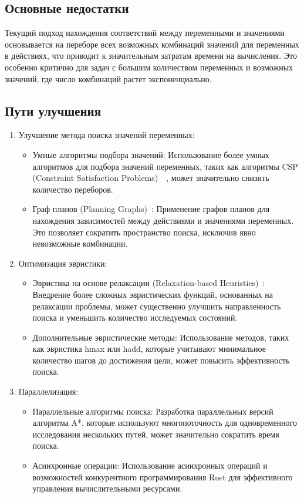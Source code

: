 \documentclass{article}
\begin{document}
\subsection{Основные недостатки}

Текущий подход нахождения соответствий между переменными и значениями основывается на переборе всех возможных комбинаций значений для переменных в действиях, что приводит к значительным затратам времени на вычисления. Это особенно критично для задач с большим количеством переменных и возможных значений, где число комбинаций растет экспоненциально.

\subsection{Пути улучшения}

\begin{enumerate}
  \item Улучшение метода поиска значений переменных:
    \begin{itemize}
      \item Умные алгоритмы подбора значений: Использование более умных алгоритмов для подбора значений переменных, таких как алгоритмы CSP (Constraint Satisfaction Problems)~\cite{ghallab2004automated}~\cite{miguel2002csp}, может значительно снизить количество переборов.
      \item Граф планов (Planning Graphs)~\cite{BLUM1997281}: Применение графов планов для нахождения зависимостей между действиями и значениями переменных. Это позволяет сократить пространство поиска, исключив явно невозможные комбинации.
    \end{itemize}
   
\item Оптимизация эвристики:
  \begin{itemize}
    \item Эвристика на основе релаксации (Relaxation-based Heuristics)~\cite{stolba2014relaxation}: Внедрение более сложных эвристических функций, основанных на релаксации проблемы, может существенно улучшить направленность поиска и уменьшить количество исследуемых состояний.
     \item Дополнительные эвристические методы: Использование методов, таких как эвристика hmax или hadd, которые учитывают минимальное количество шагов до достижения цели, может повысить эффективность поиска.
  \end{itemize}

  \item Параллелизация:
    \begin{itemize}
      \item Параллельные алгоритмы поиска: Разработка параллельных версий алгоритма A*, которые используют многопоточность для одновременного исследования нескольких путей, может значительно сократить время поиска.
     \item Асинхронные операции: Использование асинхронных операций и возможностей конкурентного программирования Rust для эффективного управления вычислительными ресурсами.
    \end{itemize}


\end{enumerate}
\end{document}
